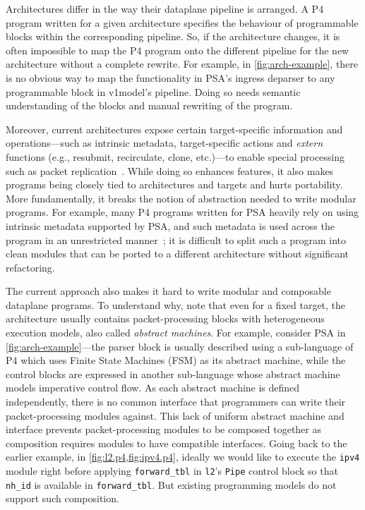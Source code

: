 \documentclass[letterpaper,twocolumn,10pt]{article}
\begin{document}
Architectures differ in the way their dataplane pipeline is arranged.
A P4 program written for a given architecture specifies the behaviour
of programmable blocks within the corresponding pipeline. So, if the
architecture changes, it is often impossible to map the P4 program
onto the different pipeline for the new architecture without a
complete rewrite. For example, in \cref{fig:arch-example}, there is no
obvious way to map the functionality in PSA's ingress deparser to any
programmable block in v1model's pipeline. Doing so needs semantic
understanding of the blocks and manual rewriting of the program.

Moreover, current architectures expose certain target-specific
information and operations---such as intrinsic metadata,
target-specific actions and \emph{extern} functions (e.g., resubmit,
recirculate, clone, etc.)---to enable special processing such as
packet replication~\cite{simple_switch.md,psa}. While doing so
enhances features, it also makes programs being closely tied to
architectures and targets and hurts portability. More fundamentally,
it breaks the notion of abstraction needed to write modular programs.
For example, many P4 programs written for PSA heavily rely on using
intrinsic metadata supported by PSA, and such metadata is used across
the program in an unrestricted manner~\cite{switch.p4}; it is
difficult to split such a program into clean modules that can be
ported to a different architecture without significant refactoring.

The current approach also makes it hard to write modular and
composable dataplane programs. To understand why, note that even for a
fixed target, the architecture usually contains packet-processing
blocks with heterogeneous execution models, also called \emph{abstract
machines}. For example, consider PSA in \cref{fig:arch-example}---the
parser block  is usually described using a sub-language of P4 which
uses Finite State Machines (FSM) as its abstract machine, while the
control blocks are expressed in another sub-language whose abstract
machine models imperative control flow. As each abstract machine is
defined independently, there is no common interface that programmers
can write their packet-processing modules against. This lack of
uniform abstract machine and interface prevents packet-processing
modules to be composed together as composition requires modules to
have compatible interfaces. Going back to the earlier example, in
\cref{fig:l2.p4,fig:ipv4.p4}, ideally we would like to execute the
\texttt{ipv4} module right before applying \texttt{forward\_tbl} in
\texttt{l2}'s \texttt{Pipe} control block so that \texttt{nh\_id} is
available in \texttt{forward\_tbl}. But existing programming models do
not support such composition.
\end{document}
